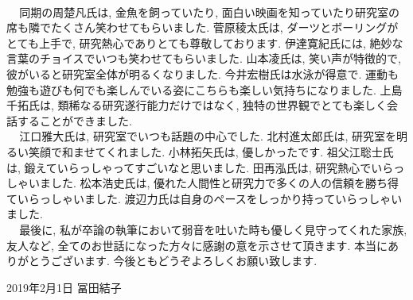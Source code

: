 \\\ \ \,同期の周楚凡氏は,  金魚を飼っていたり, 面白い映画を知っていたり研究室の席も隣でたくさん笑わせてもらいました. 菅原稜太氏は, ダーツとボーリングがとても上手で, 研究熱心でありとても尊敬しております. 伊達寛紀氏には, 絶妙な言葉のチョイスでいつも笑わせてもらいました. 山本凌氏は, 笑い声が特徴的で, 彼がいると研究室全体が明るくなりました. 今井宏樹氏は水泳が得意で. 運動も勉強も遊びも何でも楽しんでいる姿にこちらも楽しい気持ちになりました. 上島千拓氏は, 類稀なる研究遂行能力だけではなく, 独特の世界観でとても楽しく会話することができました. 
\\\ \ \,江口雅大氏は, 研究室でいつも話題の中心でした. 北村進太郎氏は, 研究室を明るい笑顔で和ませてくれました. 小林拓矢氏は, 優しかったです. 祖父江聡士氏は, 鍛えていらっしゃってすごいなと思いました. 田再泓氏は, 研究熱心でいらっしゃいました. 松本浩史氏は, 優れた人間性と研究力で多くの人の信頼を勝ち得ていらっしゃいました. 渡辺力氏は自身のペースをしっかり持っていらっしゃいました. 
\\\ \ \,最後に, 私が卒論の執筆において弱音を吐いた時も優しく見守ってくれた家族, 友人など, 全てのお世話になった方々に感謝の意を示させて頂きます. 本当にありがとうございます. 今後ともどうぞよろしくお願い致します. 
\begin{flushright}
  2019年2月1日 冨田結子
\end{flushright}
